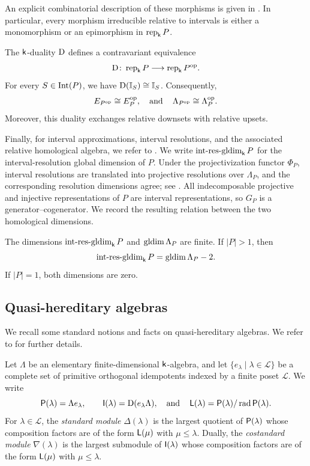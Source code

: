 An explicit combinatorial description of these morphisms is given in
\cite[Proposition~6.8]{BBH25}. In particular, every morphism irreducible
relative to intervals is either a monomorphism or an epimorphism in
$\operatorname{rep}_{\mathsf{k}} P$.



The $\mathsf{k}$-duality $\mathrm D$ defines a contravariant equivalence
\begin{equation}
\mathrm D\colon
\operatorname{rep}_{\mathsf{k}} P
\longrightarrow
\operatorname{rep}_{\mathsf{k}} P^{\mathrm{op}}.
\label{eq:poset-duality}
\end{equation}
For every $S\in\operatorname{Int}(P)$, we have $\mathrm D(\mathbb I_S)\cong\mathbb I_S$. Consequently,
\[
E_{P^{\mathrm{op}}}\cong E_P^{\mathrm{op}},
\operatorname{\quad \text{and} \quad}\nolimits
\Lambda_{P^{\mathrm{op}}}\cong\Lambda_P^{\mathrm{op}}.
\]
Moreover, this duality exchanges relative downsets with relative upsets.


\medskip
Finally, for interval approximations, interval resolutions, and the associated
relative homological algebra, we refer to \cite{AENY,BBH24,BBH25}.
We write $\operatorname{int\text{-}res\text{-}gldim}_{\mathsf{k}} P$ for the interval-resolution global
dimension of $P$.  Under the projectivization functor $\Phi_P$,
interval resolutions are translated into projective resolutions over
$\Lambda_P$, and the corresponding resolution dimensions agree; see
\cite[Proposition~3.13]{AENY}. 
All indecomposable projective and injective representations of $P$ are
interval representations, so $G_P$ is a generator--cogenerator.
We record the resulting relation between the two homological dimensions.


\begin{proposition}
\label{prop:relative-auslander}
The dimensions $\operatorname{int\text{-}res\text{-}gldim}_{\mathsf{k}} P$ and $\operatorname{gldim}\Lambda_P$ are finite.
If $|P|>1$, then
\begin{equation}    
\operatorname{int\text{-}res\text{-}gldim}_{\mathsf{k}} P
=
\operatorname{gldim}\Lambda_P-2.
\label{eq:relative-Auslander-formula}
\end{equation}
If $|P|=1$, both dimensions are zero.
\end{proposition}





\subsection{Quasi-hereditary algebras}\label{sec:prelim-qh}

We recall some standard notions and facts on quasi-hereditary algebras.
We refer to \cite{CPS,DR89} for further details.

Let $\Lambda$ be an elementary finite-dimensional $\mathsf{k}$-algebra, and let
$\{e_\lambda\mid \lambda\in\mathcal L\}$ be a complete set of primitive
orthogonal idempotents indexed by a finite poset $\mathcal L$. We write
\[
\mathsf P(\lambda)=\Lambda e_\lambda,
\qquad
\mathsf I(\lambda)=\mathrm D(e_\lambda\Lambda),
\operatorname{\quad \text{and} \quad}\nolimits
\mathsf L(\lambda)=\mathsf P(\lambda)/\operatorname{rad}\mathsf P(\lambda).
\]
For $\lambda\in\mathcal L$, the \emph{standard module}
$\Delta(\lambda)$ is the largest quotient of $\mathsf P(\lambda)$ whose
composition factors are of the form $\mathsf L(\mu)$ with
$\mu\leq\lambda$. Dually, the \emph{costandard module}
$\nabla(\lambda)$ is the largest submodule of $\mathsf I(\lambda)$ whose
composition factors are of the form $\mathsf L(\mu)$ with
$\mu\leq\lambda$.

